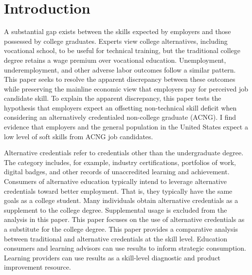 \documentclass[review]{elsarticle}
\begin{document}
\pagebreak
\linenumbers

\section{Introduction}



A substantial gap exists between the skills expected by employers and those possessed by college graduates\cite{mcgarry2016examination, malik2017great, abbasi2018analysis, gingras2000there}.
Experts view college alternatives,
including vocational school,
to be useful for technical training,
but the traditional college degree retains a wage premium over vocational education.
Unemployment, underemployment, and other adverse labor outcomes follow a similar pattern\cite{smith_2011}.
This paper seeks to resolve the apparent discrepancy between these outcomes while preserving the mainline economic view that employers pay for perceived job candidate skill.
To explain the apparent discrepancy,
this paper tests the hypothesis that employers expect an offsetting non-technical skill deficit when considering an alternatively credentialed non-college graduate (ACNG).
I find evidence that employers and the general population in the United States expect a low level of soft skills from ACNG job candidates.

Alternative credentials refer to credentials other than the undergraduate degree\cite{brown2017complex}.
The category includes, for example,
industry certifications,
portfolios of work,
digital badges, and other records of unaccredited learning and achievement.
Consumers of alternative education typically intend to leverage alternative credentials toward better employment.
That is, they typically have the same goals as a college student.
Many individuals obtain alternative credentials as a supplement to the college degree.
Supplemental usage is excluded from the analysis in this paper.
This paper focuses on the use of alternative credentials as a substitute for the college degree.
This paper provides a comparative analysis between traditional and alternative credentials at the skill level.
Education consumers and learning advisors can use results to inform strategic consumption.
Learning providers can use results as a skill-level diagnostic and product improvement resource.
\end{document}
